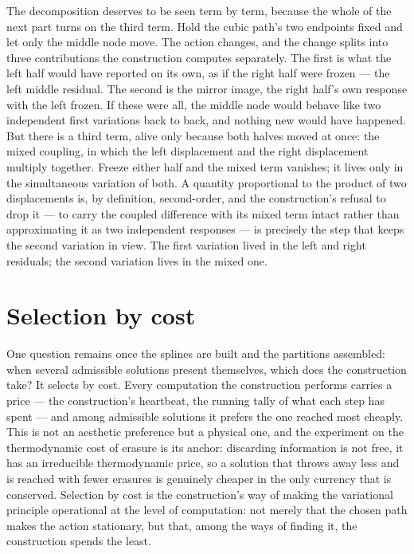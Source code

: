 The decomposition deserves to be seen term by term, because the whole of the next part turns on the
third term. Hold the cubic path's two endpoints fixed and let only the middle node move. The action
changes, and the change splits into three contributions the construction computes separately. The first
is what the left half would have reported on its own, as if the right half were frozen --- the left
middle residual. The second is the mirror image, the right half's own response with the left frozen. If
these were all, the middle node would behave like two independent first variations back to back, and
nothing new would have happened. But there is a third term, alive only because both halves moved at
once: the mixed coupling, in which the left displacement and the right displacement multiply together.
Freeze either half and the mixed term vanishes; it lives only in the simultaneous variation of both. A
quantity proportional to the product of two displacements is, by definition, second-order, and the
construction's refusal to drop it --- to carry the coupled difference with its mixed term intact rather
than approximating it as two independent responses --- is precisely the step that keeps the second
variation in view. The first variation lived in the left and right residuals; the second variation
lives in the mixed one.

\section{Selection by cost}
\label{se:selection-by-cost}

One question remains once the splines are built and the partitions assembled: when several admissible
solutions present themselves, which does the construction take? It selects by cost. Every computation
the construction performs carries a price --- the construction's heartbeat, the running tally of what
each step has spent --- and among admissible solutions it prefers the one reached most cheaply. This is
not an aesthetic preference but a physical one, and the experiment on the thermodynamic cost of erasure
is its anchor: discarding information is not free, it has an irreducible thermodynamic price, so a
solution that throws away less and is reached with fewer erasures is genuinely cheaper in the only
currency that is conserved. Selection by cost is the construction's way of making the variational
principle operational at the level of computation: not merely that the chosen path makes the action
stationary, but that, among the ways of finding it, the construction spends the least.

